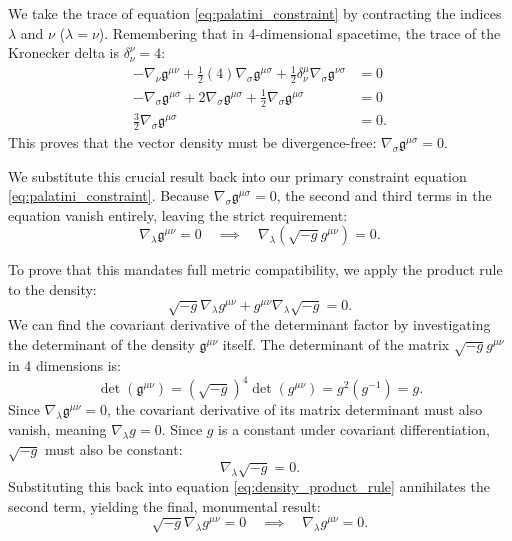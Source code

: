 \documentclass[11pt, a4paper]{report}
\begin{document}
We take the trace of equation \eqref{eq:palatini_constraint} by contracting the indices $\lambda$ and $\nu$ ($\lambda = \nu$). Remembering that in 4-dimensional spacetime, the trace of the Kronecker delta is $\delta^{\nu}_{\nu} = 4$:
\begin{align}
-\nabla_{\nu}\mathfrak{g}^{\mu\nu} + \frac{1}{2}(4) \nabla_{\sigma}\mathfrak{g}^{\mu\sigma} + \frac{1}{2}\delta^{\mu}_{\nu} \nabla_{\sigma}\mathfrak{g}^{\nu\sigma} &= 0 \nonumber \\
-\nabla_{\sigma}\mathfrak{g}^{\mu\sigma} + 2 \nabla_{\sigma}\mathfrak{g}^{\mu\sigma} + \frac{1}{2}\nabla_{\sigma}\mathfrak{g}^{\mu\sigma} &= 0 \nonumber \\
\frac{3}{2} \nabla_{\sigma}\mathfrak{g}^{\mu\sigma} &= 0.
\end{align}
This proves that the vector density must be divergence-free: $\nabla_{\sigma}\mathfrak{g}^{\mu\sigma} = 0$. 

We substitute this crucial result back into our primary constraint equation \eqref{eq:palatini_constraint}. Because $\nabla_{\sigma}\mathfrak{g}^{\mu\sigma} = 0$, the second and third terms in the equation vanish entirely, leaving the strict requirement:
\begin{equation}
\nabla_{\lambda}\mathfrak{g}^{\mu\nu} = 0 \quad \implies \quad \nabla_{\lambda}(\sqrt{-g}g^{\mu\nu}) = 0.
\end{equation}

To prove that this mandates full metric compatibility, we apply the product rule to the density:
\begin{equation}
\label{eq:density_product_rule}
\sqrt{-g}\nabla_{\lambda}g^{\mu\nu} + g^{\mu\nu}\nabla_{\lambda}\sqrt{-g} = 0.
\end{equation}
We can find the covariant derivative of the determinant factor by investigating the determinant of the density $\mathfrak{g}^{\mu\nu}$ itself. The determinant of the matrix $\sqrt{-g}g^{\mu\nu}$ in 4 dimensions is:
\begin{equation}
\det(\mathfrak{g}^{\mu\nu}) = (\sqrt{-g})^{4} \det(g^{\mu\nu}) = g^{2} (g^{-1}) = g.
\end{equation}
Since $\nabla_{\lambda}\mathfrak{g}^{\mu\nu} = 0$, the covariant derivative of its matrix determinant must also vanish, meaning $\nabla_{\lambda}g = 0$. Since $g$ is a constant under covariant differentiation, $\sqrt{-g}$ must also be constant:
\begin{equation}
\nabla_{\lambda}\sqrt{-g} = 0.
\end{equation}
Substituting this back into equation \eqref{eq:density_product_rule} annihilates the second term, yielding the final, monumental result:
\begin{equation}
\sqrt{-g} \nabla_{\lambda}g^{\mu\nu} = 0 \quad \implies \quad \nabla_{\lambda}g^{\mu\nu} = 0.
\end{equation}
\end{document}
